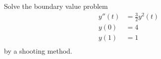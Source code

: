 \documentclass{jhwhw}
\begin{document}
\problem{}

    Solve the boundary value problem
    \begin{align*}
	y''(t) &= \frac{3}{2}y^2(t) \\
	y(0) &= 4 \\
	y(1) &= 1 \\
    \end{align*}
    by a shooting method.

\solution

    \begin{figure}[H]
	\centering
    \end{figure}
\end{document}
